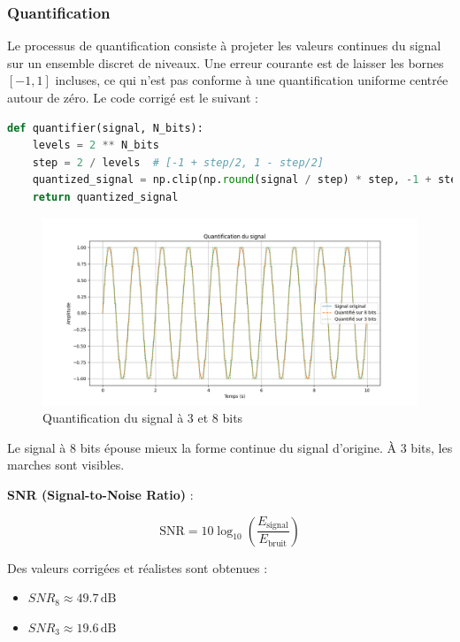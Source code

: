 \subsubsection{Quantification}

Le processus de quantification consiste à projeter les valeurs continues du signal sur un ensemble discret de niveaux. Une erreur courante est de laisser les bornes \([-1, 1]\) incluses, ce qui n’est pas conforme à une quantification uniforme centrée autour de zéro. Le code corrigé est le suivant :

\begin{lstlisting}[language=python]
def quantifier(signal, N_bits):
    levels = 2 ** N_bits
    step = 2 / levels  # [-1 + step/2, 1 - step/2]
    quantized_signal = np.clip(np.round(signal / step) * step, -1 + step, 1 - step)
    return quantized_signal
\end{lstlisting}

\begin{figure}[!h]
\centering
\includegraphics[width=17cm]{screenshots/Quantification.png}
\caption{Quantification du signal à 3 et 8 bits}
\end{figure}

Le signal à 8 bits épouse mieux la forme continue du signal d’origine. À 3 bits, les marches sont visibles.

\textbf{SNR (Signal-to-Noise Ratio)} :

\[
\text{SNR} = 10 \log_{10} \left(\frac{E_{\text{signal}}}{E_{\text{bruit}}} \right)
\]

Des valeurs corrigées et réalistes sont obtenues :

\begin{itemize}
    \item \( SNR_{8} \approx 49.7\, \text{dB} \)
    \item \( SNR_{3} \approx 19.6\, \text{dB} \)
\end{itemize}

